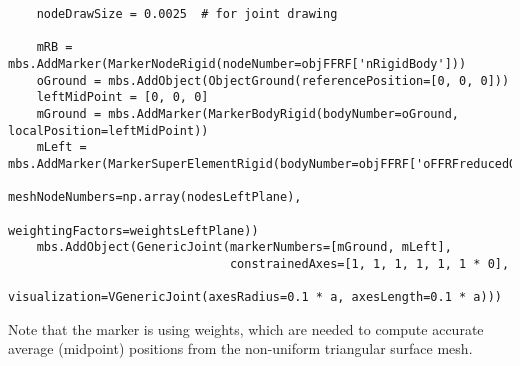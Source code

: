 \pythonstyle\begin{lstlisting}
    nodeDrawSize = 0.0025  # for joint drawing

    mRB = mbs.AddMarker(MarkerNodeRigid(nodeNumber=objFFRF['nRigidBody']))
    oGround = mbs.AddObject(ObjectGround(referencePosition=[0, 0, 0]))
    leftMidPoint = [0, 0, 0]
    mGround = mbs.AddMarker(MarkerBodyRigid(bodyNumber=oGround, localPosition=leftMidPoint))
    mLeft = mbs.AddMarker(MarkerSuperElementRigid(bodyNumber=objFFRF['oFFRFreducedOrder'], 
                                                  meshNodeNumbers=np.array(nodesLeftPlane), 
                                                  weightingFactors=weightsLeftPlane))
    mbs.AddObject(GenericJoint(markerNumbers=[mGround, mLeft], 
                               constrainedAxes=[1, 1, 1, 1, 1, 1 * 0],
                               visualization=VGenericJoint(axesRadius=0.1 * a, axesLength=0.1 * a)))
\end{lstlisting}
Note that the marker is using weights, which are needed to compute accurate average (midpoint) positions from the non-uniform triangular surface mesh.

